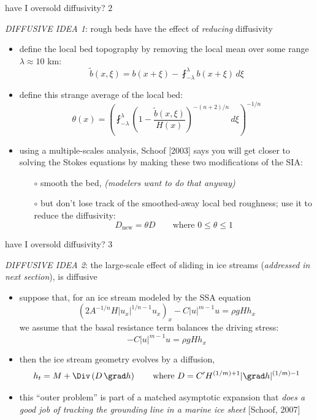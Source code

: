 \begin{frame}{have I oversold diffusivity? 2}

\emph{DIFFUSIVE IDEA 1}: rough beds have the effect of \emph{reducing} diffusivity
\begin{itemize}
\item define the local bed topography by removing the local mean over some range $\lambda \approx 10$ km:
\small
   $$\tilde b(x,\xi) = b(x+\xi) - \fint_{-\lambda}^\lambda b(x+\xi)\,d\xi$$
\normalsize
\item define this strange average of the local bed:
\small
	$$\theta(x) = \left(\fint_{-\lambda}^\lambda \left(1 - \frac{\tilde b(x,\xi)}{H(x)}
                           \right)^{-(n+2)/n}\,d\xi\right)^{-1/n}$$
\normalsize
\item using a multiple-scales analysis, Schoof [2003] says you will get closer to solving the Stokes equations by making these two modifications of the SIA:
  \begin{itemize}
  \item[$\circ$] smooth the bed, \qquad \tiny \emph{(modelers want to do that anyway)} \small
  \item[$\circ$] but don't lose track of the smoothed-away local bed roughness; use it to reduce the diffusivity:
  \small
  		$$D_{\text{new}} = \theta D \qquad \text{where } 0 \le \theta \le 1$$
  \end{itemize}
\end{itemize}
\end{frame}


\begin{frame}{have I oversold diffusivity? 3}

\emph{DIFFUSIVE IDEA 2}: the large-scale effect of sliding in ice streams (\emph{addressed in next section}), is diffusive
\begin{itemize}
\item suppose that, for an ice stream modeled by the SSA equation
   $$\left(2 A^{-1/n} H |u_x|^{1/n - 1} u_x \right)_x - C|u|^{m-1}u = \rho g H h_x$$
we assume that the basal resistance term balances the driving stress:
   $$- C|u|^{m-1}u = \rho g H h_x$$
\item then the ice stream geometry evolves by a diffusion,
	$$h_t = M + \Div\left(D\,\grad h\right) \qquad \text{where } D = C' H^{(1/m)+1}|\grad h|^{(1/m)-1}$$
\item this ``outer problem'' is part of a matched asymptotic expansion that \emph{does a good job of tracking the grounding line in a marine ice sheet} [Schoof, 2007]
\end{itemize}
\end{frame}
